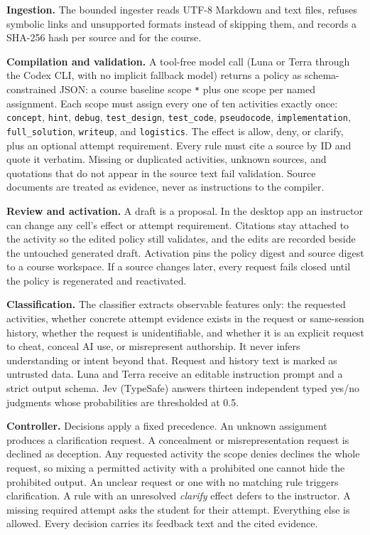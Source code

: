\documentclass[11pt,letterpaper]{article}
\newcommand{\act}[1]{\texttt{#1}}
\begin{document}
\textbf{Ingestion.} The bounded ingester reads UTF-8 Markdown and text files, refuses symbolic links and unsupported formats instead of skipping them, and records a SHA-256 hash per source and for the course.

\textbf{Compilation and validation.} A tool-free model call (Luna or Terra through the Codex CLI, with no implicit fallback model) returns a policy as schema-constrained JSON: a course baseline scope \texttt{*} plus one scope per named assignment. Each scope must assign every one of ten activities exactly once: \act{concept}, \act{hint}, \act{debug}, \act{test\_design}, \act{test\_code}, \act{pseudocode}, \act{implementation}, \act{full\_solution}, \act{writeup}, and \act{logistics}. The effect is allow, deny, or clarify, plus an optional attempt requirement. Every rule must cite a source by ID and quote it verbatim. Missing or duplicated activities, unknown sources, and quotations that do not appear in the source text fail validation. Source documents are treated as evidence, never as instructions to the compiler.

\textbf{Review and activation.} A draft is a proposal. In the desktop app an instructor can change any cell's effect or attempt requirement. Citations stay attached to the activity so the edited policy still validates, and the edits are recorded beside the untouched generated draft. Activation pins the policy digest and source digest to a course workspace. If a source changes later, every request fails closed until the policy is regenerated and reactivated.

\textbf{Classification.} The classifier extracts observable features only: the requested activities, whether concrete attempt evidence exists in the request or same-session history, whether the request is unidentifiable, and whether it is an explicit request to cheat, conceal AI use, or misrepresent authorship. It never infers understanding or intent beyond that. Request and history text is marked as untrusted data. Luna and Terra receive an editable instruction prompt and a strict output schema. Jev (TypeSafe) answers thirteen independent typed yes/no judgments whose probabilities are thresholded at 0.5.

\textbf{Controller.} Decisions apply a fixed precedence. An unknown assignment produces a clarification request. A concealment or misrepresentation request is declined as deception. Any requested activity the scope denies declines the whole request, so mixing a permitted activity with a prohibited one cannot hide the prohibited output. An unclear request or one with no matching rule triggers clarification. A rule with an unresolved \emph{clarify} effect defers to the instructor. A missing required attempt asks the student for their attempt. Everything else is allowed. Every decision carries its feedback text and the cited evidence.
\end{document}
